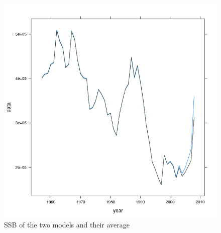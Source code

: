 \documentclass[a4paper,english,10pt]{article}\usepackage[]{graphicx}\usepackage[]{color}
\makeatletter
\def\maxwidth{ %
  \ifdim\Gin@nat@width>\linewidth
    \linewidth
  \else
    \Gin@nat@width
  \fi
}
\newenvironment{knitrout}{}{} %
\makeatother
\begin{document}
\begin{knitrout}
\color{fgcolor}\begin{figure}[H]

{\centering \includegraphics[width=\maxwidth]{figure/ssbmodav-1} 

}

\caption[SSB of the two models and their average]{SSB of the two models and their average}\label{fig:ssbmodav}
\end{figure}


\end{knitrout}
\end{document}
